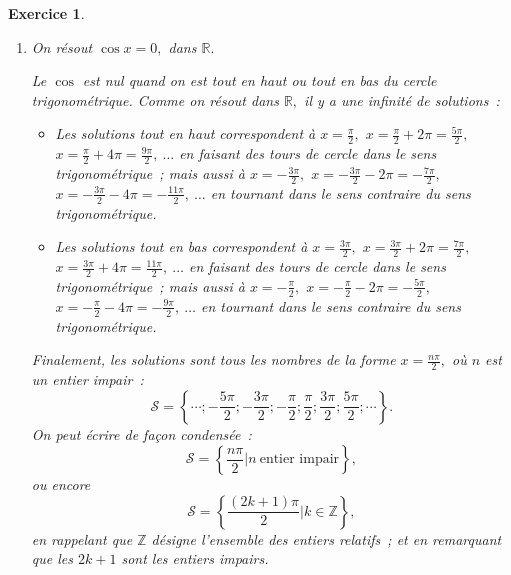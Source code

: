 \documentclass[10pt]{article}
\newtheorem{exo}{Exercice}
\begin{document}
\begin{exo}
\begin{enumerate}

\item \begin{multicols}{2} On résout $\cos x=0,$ dans $\mathbb{R}.$

\medskip

Le $\cos$ est nul quand on est tout en haut ou tout en bas du cercle trigonométrique. Comme on résout dans $\mathbb{R},$ il y a une infinité de solutions~:

\begin{itemize}
\item[\textbullet] Les solutions tout en haut correspondent à $x=\frac{\pi}{2},$ $x=\frac{\pi}{2}+2\pi=\frac{5\pi}{2},$ $x=\frac{\pi}{2}+4\pi=\frac{9\pi}{2},~\dots$ en faisant des tours de cercle dans le sens trigonométrique~; mais aussi à $x=-\frac{3\pi}{2},$ $x=-\frac{3\pi}{2}-2\pi=-\frac{7\pi}{2},$ $x=-\frac{3\pi}{2}-4\pi=-\frac{11\pi}{2},~\dots$ en tournant dans le sens contraire du sens trigonométrique.
\item[\textbullet] Les solutions tout en bas correspondent à $x=\frac{3\pi}{2},$ $x=\frac{3\pi}{2}+2\pi=\frac{7\pi}{2},$ $x=\frac{3\pi}{2}+4\pi=\frac{11\pi}{2},~\dots$ en faisant des tours de cercle dans le sens trigonométrique~; mais aussi à $x=-\frac{\pi}{2},$ $x=-\frac{\pi}{2}-2\pi=-\frac{5\pi}{2},$ $x=-\frac{\pi}{2}-4\pi=-\frac{9\pi}{2},~\dots$ en tournant dans le sens contraire du sens trigonométrique.
\end{itemize}

\medskip

Finalement, les solutions sont tous les nombres de la forme $x=\frac{n\pi}{2},$ où $n$ est un entier impair~:
\[\mathcal{S}=\left\{\cdots;-\frac{5\pi}{2};-\frac{3\pi}{2};-\frac{\pi}{2};\frac{\pi}{2};\frac{3\pi}{2};\frac{5\pi}{2};\cdots\right\}.\]
On peut écrire de façon condensée~:
\[\mathcal{S}=\left\{\frac{n\pi}{2}\big|n~\text{entier impair}\right\},\]
ou encore
\[\mathcal{S}=\left\{\frac{(2k+1)\pi}{2}\big|k\in\mathbb{Z}\right\},\]
en rappelant que $\mathbb{Z}$ désigne l'ensemble des entiers relatifs~; et en remarquant que les $2k+1$ sont les entiers impairs.


\end{multicols}
\end{enumerate}
\end{exo}
\end{document}
